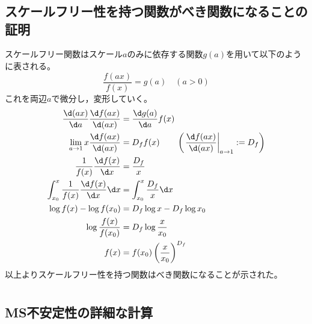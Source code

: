 \documentclass[autodetect-engine,dvi=dvipdfmx,a4paper,ja=standard,oneside,openany,11pt,draft]{bxjsbook}
\begin{document}
\appendix
\chapter{}
\section{スケールフリー性を持つ関数がべき関数になることの証明}
\label{sec:scale_free}
スケールフリー関数はスケール$a$のみに依存する関数$g(a)$を用いて以下のように表される。
\begin{equation}
  \frac{f(ax)}{f(x)}=g(a) \quad (a>0)
\end{equation}
これを両辺$a$で微分し，変形していく。
\begin{equation}
  \begin{split}
    \frac{\d (ax)}{\d a}\frac{\d f(ax)}{\d (ax)}          & =\frac{\d g(a)}{\d a}f(x)                                                       \\
    \lim_{a\to 1}x\frac{\d f(ax)}{\d (ax)}                & =D_f f(x) \qquad\left(\left.\frac{\d f(ax)}{\d (ax)}\right|_{a\to1}:=D_f\right) \\
    \frac{1}{f(x)}\frac{\d f(x)}{\d x}                    & =\frac{D_f}{x}                                                                  \\
    \int_{x_0}^{x} \frac{1}{f(x)}\frac{\d f(x)}{\d x}\d x & =\int_{x_0}^{x} \frac{D_f}{x}\d x                                               \\
    \log f(x)-\log f(x_0)                                 & =D_f\log x-D_f\log x_0                                                          \\
    \log \frac{f(x)}{f(x_0)}                              & =D_f\log \frac{x}{x_0}                                                          \\
    f(x)                                                  & =f(x_0)\left(\frac{x}{x_0}\right)^{D_f}
  \end{split}
\end{equation}
以上よりスケールフリー性を持つ関数はべき関数になることが示された。
\chapter{}
\section{MS不安定性の詳細な計算}
\chapter{}
\end{document}
